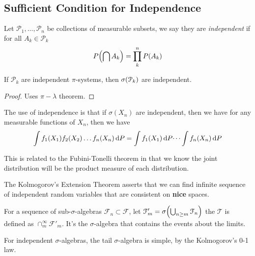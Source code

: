 \subsection{Sufficient Condition for Independence}

Let \(\mathcal{P}_{1}, \dots, \mathcal{P}_{n}\) be collections of measurable subsets, we say they are \textit{independent} if for all \(A_{k}\in \mathcal{P}_{k}\)
\begin{equation*}
    P\pqty{\cap A_{k} } = \prod_{k}^{n} P(A_{k})
\end{equation*}

\begin{thm}
    If \(\mathcal{P}_{k}\) are independent \(\pi\)-systems, then \(\sigma\pqty{\mathcal{P}_{k}}\) are independent. 
\end{thm}

\begin{proof}
    Uses \(\pi- \lambda\) theorem.
\end{proof}



The use of independence is that if \(\sigma(X_{n})\) are independent, then we have for any measurable functions of \(X_{n}\), then we have 
\begin{equation*}
    \int f_{1}\pqty{X_{1}} f_{2}\pqty{X_{2}} \dots f_{n}\pqty{X_{n}} \dd{P} = \int f_{1}\pqty{X_{1}} \dd{P} \dots \int f_{n}\pqty{X_{n}} \dd{P}
\end{equation*}

This is related to the Fubini-Tonelli theorem in that we know the joint distribution will be the product measure of each distribution.

The Kolmogorov's Extension Theorem asserts that we can find infinite sequence of independent random variables that are consistent on \textbf{nice} spaces. 


For a sequence of sub-\(\sigma\)-algebras \(\mathcal{F}_{n} \subset \mathcal{F}\), let \(\mathcal{F}'_{m} = \sigma\pqty{\cup_{n\geq m} \mathcal{F}_{n}}\) the  \(\mathcal{T}\) is defined as \(\cap_{m}^{\infty} \mathcal{F}'_{m}\). It's the \(\sigma\)-algebra that contains the events about the limits. 

For independent \(\sigma\)-algebras, the tail \(\sigma\)-algebra is simple, by the Kolmogorov's 0-1 law. 

\begin{thm}
    
\end{thm}

